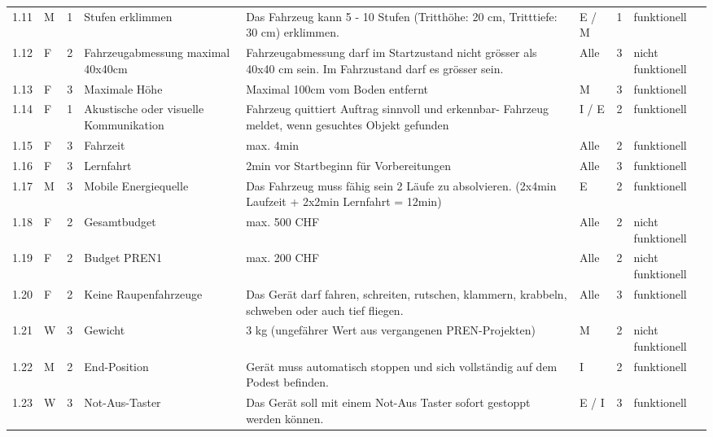 \begin{longtable}[]{@{}lllp{2cm}p{5cm}llp{2cm}@{}}
1.11 & M & 1 & Stufen erklimmen & Das Fahrzeug kann 5 - 10 Stufen
(Tritthöhe: 20 cm, Tritttiefe: 30 cm) erklimmen. & E / M & 1 &
funktionell\tabularnewline

1.12 & F & 2 & Fahrzeugabmessung maximal 40x40cm & Fahrzeugabmessung darf
im Startzustand nicht grösser als 40x40 cm sein. Im Fahrzustand darf es
grösser sein. & Alle & 3 & nicht \hbox{funktionell}\tabularnewline

1.13 & F & 3 & Maximale Höhe & Maximal 100cm vom Boden entfernt & M & 3
& funktionell\tabularnewline

1.14 & F & 1 & Akustische oder visuelle Kommunikation &
Fahrzeug quittiert Auftrag sinnvoll und
erkennbar- Fahrzeug meldet, wenn gesuchtes Objekt
gefunden & I / E & 2 & funktionell\tabularnewline

1.15 & F & 3 & Fahrzeit & max. 4min & Alle & 2 &
funktionell\tabularnewline

1.16 & F & 3 & Lernfahrt & 2min vor Startbeginn für Vorbereitungen &
Alle & 3 & funktionell\tabularnewline

1.17 & M & 3 & Mobile Energiequelle & Das Fahrzeug muss fähig sein 2
Läufe zu absolvieren. (2x4min Laufzeit + 2x2min Lernfahrt = 12min) & E &
2 & funktionell\tabularnewline

1.18 & F & 2 & Gesamtbudget & max. 500 CHF & Alle & 2 & nicht
\hbox{funktionell}\tabularnewline

1.19 & F & 2 & Budget PREN1 & max. 200 CHF & Alle & 2 & nicht
\hbox{funktionell}\tabularnewline

1.20 & F & 2 & Keine Raupenfahrzeuge & Das Gerät darf fahren, schreiten,
rutschen, klammern, krabbeln, schweben oder auch tief fliegen. & Alle &
3 & funktionell\tabularnewline

1.21 & W & 3 & Gewicht & 3 kg (ungefährer Wert aus vergangenen
PREN-Projekten) & M & 2 & nicht \hbox{funktionell}\tabularnewline

1.22 & M & 2 & End-Position & Gerät muss automatisch stoppen und sich
vollständig auf dem Podest befinden. & I & 2 &
funktionell\tabularnewline

1.23 & W & 3 & Not-Aus-Taster & Das Gerät soll mit einem Not-Aus Taster
sofort gestoppt werden können. & E / I & 3 & funktionell\tabularnewline

\end{longtable}
\normalsize